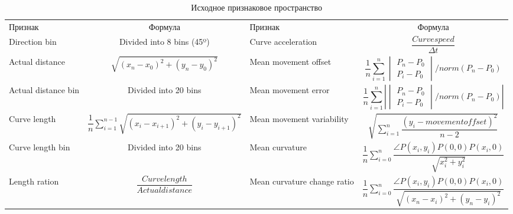 \documentclass[12pt]{article}
\begin{document}
    \begin{table}[h]
        \centering
        \footnotesize
        \renewcommand{\arraystretch}{2.2}
        \renewcommand{\tabcolsep}{1mm}
        \caption{Исходное признаковое пространство}
        \begin{tabular}[c]{ || m{20mm} | c || m{20mm} | c ||}
            \hhline{|t:==:t:==:t|} 
            Признак & Формула &  Признак &  Формула \\ [2mm]
            \hhline{|:==::==:|} 
            Direction bin & \centering Divided into 8 bins (45º) &
            Curve acceleration & {\centering $\dfrac{Curvespeed}{\Delta t}$} \\
            \hhline{||-|-||-|-||}
            Actual distance & {\centering $\sqrt{(x_n-x_0)^2 + (y_n-y_0)^2}$} &
            Mean movement offset & \begin{equation*} \dfrac{1}{n} \sum_{i=1}^{n} \begin{vmatrix} P_n - P_0 \\ P_i - P_0  \end{vmatrix} / norm(P_n - P_0) \end{equation*} \\
            \hhline{||-|-||-|-||}
            Actual distance bin & {\centering Divided into 20 bins} &
            Mean movement error & {\centering \begin{equation*} \dfrac{1}{n} \sum_{i=1}^{n} \left| \begin{vmatrix} P_n - P_0 \\ P_i - P_0  \end{vmatrix} / norm(P_n - P_0) \right| \end{equation*}} \\
            \hhline{||-|-||-|-||}
            Curve length & {\centering $\dfrac{1}{n} \sum_{i=1}^{n-1} \sqrt{(x_i-x_{i+1})^2 + (y_i-y_{i+1})^2}$} &
            Mean movement variability & {\centering $\sqrt{\sum_{i=1}^{n} \dfrac{(y_i - movementoffset)^2}{n-2}}$} \\
            \hhline{||-|-||-|-||}
            Curve length bin & {\centering Divided into 20 bins} &
            Mean curvature & {\centering $\dfrac{1}{n} \sum_{i=0}^{n} \dfrac{\angle P(x_i, y_i)P(0,0)P(x_i, 0)}{\sqrt{x_{i}^2 + y_{i}^2}}$} \\
            \hhline{||-|-||-|-||}
            Length ration & {\centering $\dfrac{Curvelength}{Actualdistance}$} &
            Mean curvature change ratio & {\centering $\dfrac{1}{n} \sum_{i=0}^{n} \dfrac{\angle P(x_i, y_i)P(0,0)P(x_i, 0)}{\sqrt{(x_n-x_i)^2 + (y_n-y_i)^2}}$} \\

\end{tabular}
\end{table}
\end{document}
